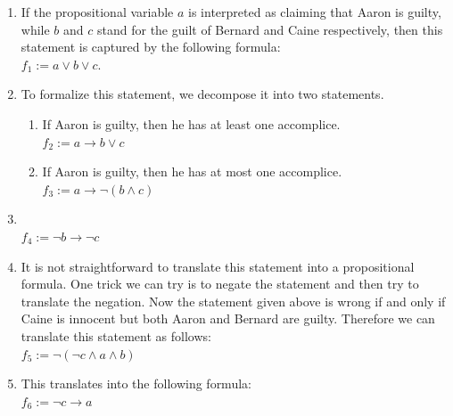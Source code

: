 \begin{enumerate}
\item {}

      If the propositional variable $a$ is interpreted as claiming that Aaron is guilty, while $b$ and $c$
      stand for the guilt of Bernard and Caine respectively, then this statement is captured by the following formula: 
      \\[0.2cm]
      \hspace*{1.3cm} 
      $f_1 := a \vee b \vee c$.
\item {}
      
      To formalize this statement, we decompose it into two statements.
      \begin{enumerate}
      \item If Aaron is guilty, then he has at least one accomplice. \\[0.2cm]
            \hspace*{1.3cm} $f_2 := a \rightarrow b \vee c$ 
      \item If Aaron is guilty, then he has at most one accomplice. \\[0.2cm]
           \hspace*{1.3cm} $f_3 := a \rightarrow \neg (b \wedge c)$
      \end{enumerate}
\item {} \\[0.2cm]
      \hspace*{1.3cm} $f_4 :=  \neg b \rightarrow \neg c$ 
\item {}

      It is not straightforward to translate this statement into a propositional formula.
      One trick we can try is to negate the statement and then try to translate the negation.
      Now the statement given above is wrong if and only if Caine is innocent but both Aaron and Bernard are guilty.
      Therefore we can translate this statement as follows: \\[0.2cm]
      \hspace*{1.3cm} $f_5 := \neg ( \neg c  \wedge a \wedge b )$ 
\item {} 

      This translates into the following formula:\\[0.2cm]
      \hspace*{1.3cm} $f_6 := \neg c \rightarrow a$
\end{enumerate}
